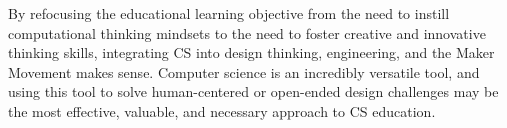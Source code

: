 By refocusing the educational learning objective from the need to instill computational thinking mindsets to the need to foster creative and innovative thinking skills, integrating CS into design thinking, engineering, and the Maker Movement makes sense. Computer science is an incredibly versatile tool, and using this tool to solve human-centered or open-ended design challenges may be the most effective, valuable, and necessary approach to CS education. \par
